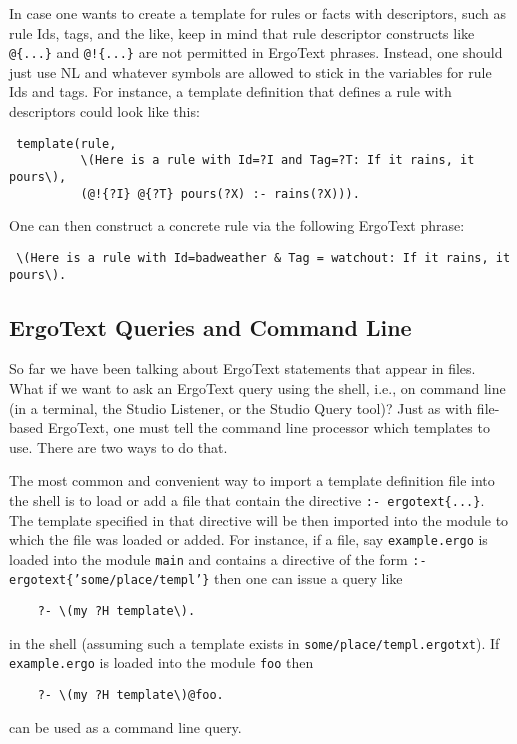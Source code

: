 In case one wants to create a template for rules or facts with descriptors,
such as rule Ids, tags, and the like, keep in mind that rule descriptor
constructs like \texttt{@\{...\}} and \texttt{@!\{...\}} are not permitted
in ErgoText phrases. Instead, one should just use NL and whatever
symbols are allowed to stick in the variables for rule Ids and tags. For
instance, a template definition that defines a rule with descriptors could
look like this:
\begin{verbatim}
 template(rule,
          \(Here is a rule with Id=?I and Tag=?T: If it rains, it pours\),
          (@!{?I} @{?T} pours(?X) :- rains(?X))).
\end{verbatim}
One can then construct a concrete \FLSYSTEM rule via the following
ErgoText phrase:
\begin{verbatim}
 \(Here is a rule with Id=badweather & Tag = watchout: If it rains, it pours\).
\end{verbatim}

\subsection{ErgoText Queries and Command Line}

So far we have been talking about ErgoText statements that appear in files.
What if we want to ask an ErgoText query using the \ERGO shell, i.e., 
on command line (in a terminal,
the Studio Listener, or the Studio Query tool)?  Just as with file-based
ErgoText, one must tell the command line processor which templates to
use. There are two ways to do that.

The most common and convenient way to import a template definition file into the \ERGO
shell is to load or add
a file that contain the directive \texttt{:- ergotext\{...\}}.
The template specified in that directive will be then imported into the
module to which the file was loaded or added.
For instance, if  a file, say
\texttt{example.ergo} is loaded into the module \texttt{main} and contains
a directive of the form \texttt{:- ergotext\{'some/place/templ'\}}     
then one can issue a query like
\begin{verbatim}
    ?- \(my ?H template\).
\end{verbatim}
in the \ERGO shell (assuming such a template exists in
\texttt{some/place/templ.ergotxt}).
If \texttt{example.ergo} is loaded into the module \texttt{foo} then
\begin{verbatim}
    ?- \(my ?H template\)@foo.
\end{verbatim}
can be used as a command line query.

